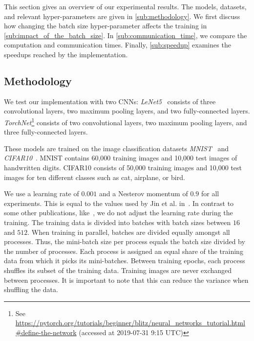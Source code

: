 \documentclass[conference]{IEEEtran}
\begin{document}
This section gives an overview of our experimental results.
The models, datasets, and relevant hyper-parameters are given in \autoref{sub:methodology}.
We first discuss how changing the batch size hyper-parameter affects the training in \autoref{sub:impact_of_the_batch_size}.
In \autoref{sub:communication_time}, we compare the computation and communication times.
Finally, \autoref{sub:speedup} examines the speedups reached by the implementation.

\subsection{Methodology} %
\label{sub:methodology}

We test our implementation with two CNNs:
\emph{LeNet5}~\cite{lecun1998gradient} consists of three convolutional layers, two maximum pooling layers, and two fully-connected layers.
\emph{TorchNet}\footnote{See \url{https://pytorch.org/tutorials/beginner/blitz/neural_networks_tutorial.html\#define-the-network} (accessed at 2019-07-31 9:15 UTC)} consists of two convolutional layers, two maximum pooling layers, and three fully-connected layers.

These models are trained on the image classification datasets \emph{MNIST}~\cite{lecun1998gradient} and \emph{CIFAR10}~\cite{krizhevsky2009CIFAR10}.
MNIST contains 60,000 training images and 10,000 test images of handwritten digits.
CIFAR10 consists of 50,000 training images and 10,000 test images for ten different classes such as cat, airplane, or bird.

We use a learning rate of $0.001$ and a Nesterov momentum of $0.9$ for all experiments.
This is equal to the values used by Jin et al. in~\cite{jin2016-How-to-scale}.
In contrast to some other publications, like~\cite{jin2016-How-to-scale}, we do not adjust the learning rate during the training.
%
The training data is divided into batches with batch sizes between $16$ and $512$.
When training in parallel, batches are divided equally amongst all processes.
Thus, the mini-batch size per process equals the batch size divided by the number of processes.
%
Each process is assigned an equal share of the training data from which it picks its mini-batches.
Between training epochs, each process shuffles its subset of the training data.
Training images are never exchanged between processes.
It is important to note that this can reduce the variance when shuffling the data.
\end{document}
